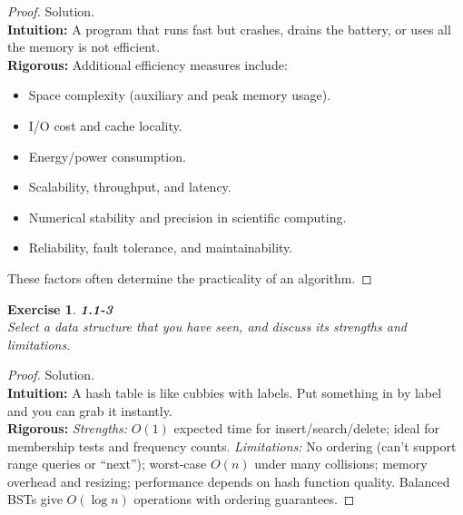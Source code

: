 \documentclass[12pt]{article}
\newtheorem{exercise}[theorem]{Exercise}
\theoremstyle{definition}
\begin{document}
\vspace{1pt}

\begin{proof}
Solution.\\

\noindent
\textbf{Intuition:} A program that runs fast but crashes, drains the battery, or
uses all the memory is not efficient.\\

\noindent
\textbf{Rigorous:} Additional efficiency measures include:
\begin{itemize}
  \item Space complexity (auxiliary and peak memory usage).
  \item I/O cost and cache locality.
  \item Energy/power consumption.
  \item Scalability, throughput, and latency.
  \item Numerical stability and precision in scientific computing.
  \item Reliability, fault tolerance, and maintainability.
\end{itemize}
These factors often determine the practicality of an algorithm.
\end{proof}

\newpage

\begin{exercise}
\noindent
\textbf{1.1-3}\\
\noindent
Select a data structure that you have seen, and discuss its strengths and
limitations.
\end{exercise}

\vspace{1pt}

\begin{proof}
Solution.\\

\noindent
\textbf{Intuition:} A hash table is like cubbies with labels. Put something in
by label and you can grab it instantly.\\

\noindent
\textbf{Rigorous:} 
\emph{Strengths:} $O(1)$ expected time for insert/search/delete; ideal for
membership tests and frequency counts.  
\emph{Limitations:} No ordering (can’t support range queries or “next”);
worst-case $O(n)$ under many collisions; memory overhead and resizing;
performance depends on hash function quality. Balanced BSTs give $O(\log n)$
operations with ordering guarantees.
\end{proof}
\end{document}
